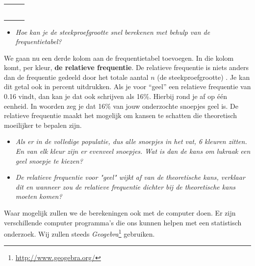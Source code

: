 \documentclass[11pt]{article}
\newcommand{\vraag}[2]{\begin{itemize}\item {\it #1} \vspace*{#2}\end{itemize}}
\begin{document}
\begin{center}
  \begin{tabular}{|p{2cm}|p{2cm}|p{2cm}|}
    \hline
    &&\vspace*{0pt}\\
    \hline
    &&\vspace*{0pt}\\
    \hline
    &&\vspace*{0pt}\\
    \hline
    &&\vspace*{0pt}\\
    \hline
    &&\vspace*{0pt}\\
    \hline
    &&\vspace*{0pt}\\
    \hline
    &&\vspace*{0pt}\\
    \hline
  \end{tabular}
\end{center}
\vspace{1cm}

\vraag{Hoe kan je de steekproefgrootte snel berekenen met behulp van de frequentietabel?}{4cm}

We gaan nu een derde kolom aan de frequentietabel toevoegen. In die kolom komt, per kleur, {\bf de
relatieve frequentie}. De relatieve frequentie is niets anders dan de frequentie gedeeld door het totale
aantal $n$ (de steekproefgrootte) . Je kan dit getal ook in percent uitdrukken. Als je voor “geel” een relatieve frequentie van
0.16 vindt, dan kan je dat ook schrijven als 16\%. Hierbij rond je af op één eenheid. In woorden zeg
je dat 16\% van jouw onderzochte snoepjes geel is. De relatieve frequentie maakt het mogelijk om kansen
te schatten die theoretisch moeilijker te bepalen zijn.

\vraag{Als er in de volledige populatie, dus alle snoepjes in het vat, 6 kleuren zitten. En
van elk kleur zijn er evenveel snoepjes. Wat is dan de kans om lukraak een geel snoepje te kiezen?}{3cm}

\vraag{De relatieve frequentie voor "geel" wijkt af van de theoretische kans, verklaar dit en wanneer
zou de relatieve frequentie dichter bij de theoretische kans moeten komen?}{3cm}

Waar mogelijk zullen we de berekeningen ook met de computer doen. Er zijn verschillende computer programma's die ons kunnen helpen met een statistisch onderzoek. Wij zullen steeds {\it Geogebra}\footnote{\url{http://www.geogebra.org/}} gebruiken.
\end{document}
